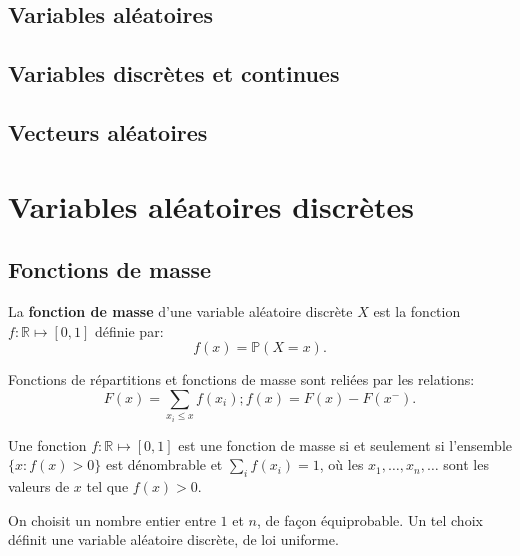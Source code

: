 \documentclass[]{book}
\theoremstyle{definition}
\theoremstyle{definition}
\theoremstyle{definition}
\theoremstyle{remark}
\let\BeginKnitrBlock\begin \let\EndKnitrBlock\end
\begin{document}
\hypertarget{variables-aluxe9atoires-1}{%
\section{Variables aléatoires}\label{variables-aluxe9atoires-1}}

\hypertarget{variables-discruxe8tes-et-continues}{%
\section{Variables discrètes et continues}\label{variables-discruxe8tes-et-continues}}

\hypertarget{vecteurs-aluxe9atoires}{%
\section{Vecteurs aléatoires}\label{vecteurs-aluxe9atoires}}

\hypertarget{variables-aluxe9atoires-discruxe8tes}{%
\chapter{Variables aléatoires discrètes}\label{variables-aluxe9atoires-discruxe8tes}}

\hypertarget{fonctions-de-masse}{%
\section{Fonctions de masse}\label{fonctions-de-masse}}

\BeginKnitrBlock{definition}
\protect\hypertarget{def:unnamed-chunk-1}{}{\label{def:unnamed-chunk-1} }La \textbf{fonction de masse} d'une variable aléatoire discrète \(X\) est la fonction \(f : \mathbb{R} \mapsto \left[0 ,1 \right]\) définie par:
\[
f(x) = \mathbb{P}(X=x) .
\]
\EndKnitrBlock{definition}

Fonctions de répartitions et fonctions de masse sont reliées par les relations:
\[
F(x) = \sum_{x_i \leq x} f(x_i) ; f(x) = F(x) - F(x^{-}) .
\]

\BeginKnitrBlock{lemma}
\protect\hypertarget{lem:unnamed-chunk-2}{}{\label{lem:unnamed-chunk-2} }Une fonction \(f : \mathbb{R} \mapsto \left[0 ,1 \right]\) est une fonction de masse si et seulement si l'ensemble \(\lbrace x : f(x) >0 \rbrace\) est dénombrable et \(\sum_{i} f(x_i) = 1\), où les \(x_1, \ldots, x_n, \ldots\) sont les valeurs de \(x\) tel que \(f(x)>0\).
\EndKnitrBlock{lemma}

\BeginKnitrBlock{example}
\protect\hypertarget{exm:unnamed-chunk-3}{}{\label{exm:unnamed-chunk-3} }On choisit un nombre entier entre \(1\) et \(n\), de façon équiprobable. Un tel choix définit une variable aléatoire discrète, de loi uniforme.
\EndKnitrBlock{example}
\end{document}
